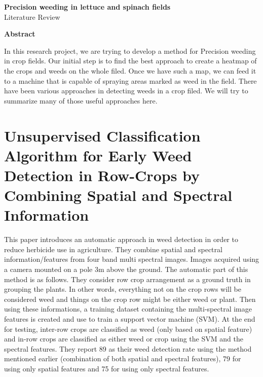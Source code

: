 \documentclass{article}
\begin{document}
  
  
\begin{center}
    {\Large {\bf Precision weeding in lettuce and spinach fields}} \\
    \vspace{0.3cm}
    {\Large Literature Review} \\
    
    \vspace{1cm}
\end{center}

{\large {\bf Abstract}}

In this research project, we are trying to develop a method for Precision weeding in crop fields. Our initial step is to find the best approach to create a heatmap of the crops and weeds on the whole filed. Once we have such a map, we can feed it to a machine that is capable of spraying areas marked as weed in the field. There have been various approaches in detecting weeds in a crop filed. We will try to summarize many of those useful approaches here. \\

\section{Unsupervised Classification Algorithm for Early
Weed Detection in Row-Crops by Combining
Spatial and Spectral Information ~\cite{louargant-2018-mdpi-unsupervised}}
	
	This paper introduces an automatic approach in weed detection in order to reduce herbicide use in agriculture. They combine spatial and spectral information/features from four band multi spectral images. Images acquired using a camera mounted on a pole 3m above the ground. The automatic part of this method is as follows. They consider row crop arrangement as a ground truth in grouping the plants. In other words, everything not on the crop rows will be considered weed and things on the crop row might be either weed or plant. Then using these informations, a training dataset containing the multi-spectral image features is created and use to train a support vector machine (SVM). At the end for testing, inter-row crops are classified as weed (only based on spatial feature) and in-row crops are classified as either weed or crop using the SVM and the spectral features. They report 89 as their weed detection rate using the method mentioned earlier (combination of both spatial and spectral features), 79 for using only spatial features and 75 for using only spectral features. 
	
\end{document}
